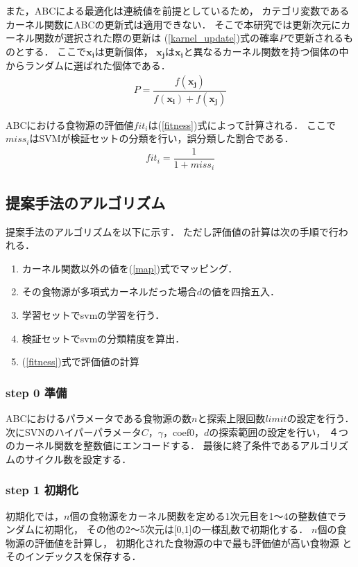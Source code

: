 また，ABCによる最適化は連続値を前提としているため，
カテゴリ変数であるカーネル関数にABCの更新式は適用できない．
そこで本研究では更新次元にカーネル関数が選択された際の更新は
(\ref{karnel_update})式の確率$P$で更新されるものとする．
ここで$\boldsymbol{x_i}$は更新個体，
$\boldsymbol{x_j}$は$\boldsymbol{x_i}$と異なるカーネル関数を持つ個体の中からランダムに選ばれた個体である．
\begin{align}
    \label{karnel_update}
   P = \dfrac{f(\boldsymbol{x_j})}{f(\boldsymbol{x_i})+f(\boldsymbol{x_j})}
\end{align}

ABCにおける食物源の評価値$fit_i$は(\ref{fitness})式によって計算される．
ここで$miss_i$はSVMが検証セットの分類を行い，誤分類した割合である．
\begin{align}
    \label{fitness}
    fit_i = \dfrac{1}{1+miss_i}
\end{align}
\subsection{提案手法のアルゴリズム}
提案手法のアルゴリズムを以下に示す．
ただし評価値の計算は次の手順で行われる．
\begin{enumerate}
    \item カーネル関数以外の値を(\ref{map})式でマッピング．
    \item その食物源が多項式カーネルだった場合$d$の値を四捨五入．
    \item 学習セットでsvmの学習を行う．
    \item 検証セットでsvmの分類精度を算出．
    \item (\ref{fitness})式で評価値の計算
\end{enumerate}

\subsubsection*{step 0 準備}
ABCにおけるパラメータである食物源の数$n$と探索上限回数$limit$の設定を行う．
次にSVNのハイパーパラメータ$C$，$\gamma$，coef0，$d$の探索範囲の設定を行い，
４つのカーネル関数を整数値にエンコードする．
最後に終了条件であるアルゴリズムのサイクル数を設定する．
\subsubsection*{step 1 初期化}
初期化では，$n$個の食物源をカーネル関数を定める1次元目を1〜4の整数値でランダムに初期化，
その他の2〜5次元は[0,1]の一様乱数で初期化する．
$n$個の食物源の評価値を計算し，
初期化された食物源の中で最も評価値が高い食物源
とそのインデックスを保存する．
